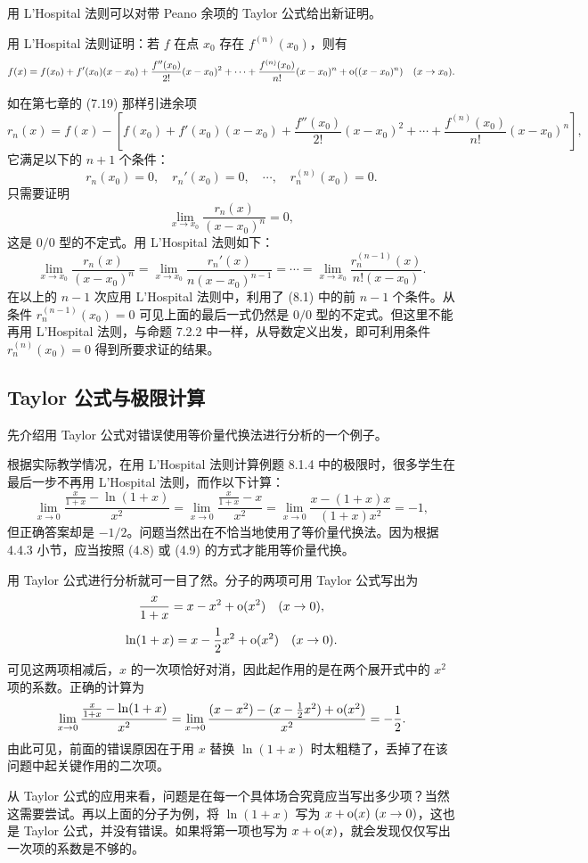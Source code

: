 用 L'Hospital 法则可以对带 Peano 余项的 Taylor 公式给出新证明。

\begin{xexample}[8.1.5]
用 L'Hospital 法则证明：若 $f$ 在点 $x_0$ 存在 $f^{(n)}(x_0)$，则有
\[
  f(x)=f(x_0)+f'(x_0)(x-x_0)+\frac{f''(x_0)}{2!}(x-x_0)^2+\cdots
  +\frac{f^{(n)}(x_0)}{n!}(x-x_0)^n+\mathrm{o}((x-x_0)^n)
  \quad(x\to x_0).
\]
\end{xexample}
\begin{xproof}
如在第七章的 (7.19) 那样引进余项
\[
  r_n(x)=f(x)-\left[f(x_0)+f'(x_0)(x-x_0)+\frac{f''(x_0)}{2!}(x-x_0)^2+\cdots
  +\frac{f^{(n)}(x_0)}{n!}(x-x_0)^n\right],
\]
它满足以下的 $n+1$ 个条件：
\begin{equation}
  r_n(x_0)=0,\quad r_n'(x_0)=0,\quad\cdots,\quad r_n^{(n)}(x_0)=0.
  \tag{8.1}
  \label{eq:8.1}
\end{equation}
只需要证明
\[
  \lim_{x\to x_0}\frac{r_n(x)}{(x-x_0)^n}=0,
\]
这是 $0/0$ 型的不定式。用 L'Hospital 法则如下：
\[
  \lim_{x\to x_0}\frac{r_n(x)}{(x-x_0)^n}
  =\lim_{x\to x_0}\frac{r_n'(x)}{n(x-x_0)^{n-1}}
  =\cdots
  =\lim_{x\to x_0}\frac{r_n^{(n-1)}(x)}{n!(x-x_0)}.
\]
在以上的 $n-1$ 次应用 L'Hospital 法则中，利用了 (8.1) 中的前 $n-1$ 个条件。从条件 $r_n^{(n-1)}(x_0)=0$ 可见上面的最后一式仍然是 $0/0$ 型的不定式。但这里不能再用 L'Hospital 法则，与命题 7.2.2 中一样，从导数定义出发，即可利用条件 $r_n^{(n)}(x_0)=0$ 得到所要求证的结果。
\end{xproof}

\subsection{Taylor 公式与极限计算}

先介绍用 Taylor 公式对错误使用等价量代换法进行分析的一个例子。

\begin{xexample}[8.1.6]
根据实际教学情况，在用 L'Hospital 法则计算例题 8.1.4 中的极限时，很多学生在最后一步不再用 L'Hospital 法则，而作以下计算：
\[
  \lim_{x\to0}\frac{\frac{x}{1+x}-\ln(1+x)}{x^2}
  =\lim_{x\to0}\frac{\frac{x}{1+x}-x}{x^2}
  =\lim_{x\to0}\frac{x-(1+x)x}{(1+x)x^2}=-1,
\]
但正确答案却是 $-1/2$。问题当然出在不恰当地使用了等价量代换法。因为根据 4.4.3 小节，应当按照 (4.8) 或 (4.9) 的方式才能用等价量代换。

用 Taylor 公式进行分析就可一目了然。分子的两项可用 Taylor 公式写出为
\[
  \frac{x}{1+x}=x-x^2+\mathrm{o}(x^2)\quad(x\to0),
\]
\[
  \ln(1+x)=x-\frac12x^2+\mathrm{o}(x^2)\quad(x\to0).
\]
可见这两项相减后，$x$ 的一次项恰好对消，因此起作用的是在两个展开式中的 $x^2$ 项的系数。正确的计算为
\[
  \lim_{x\to0}\frac{\frac{x}{1+x}-\ln(1+x)}{x^2}
  =\lim_{x\to0}\frac{(x-x^2)-(x-\frac12x^2)+\mathrm{o}(x^2)}{x^2}
  =-\frac12.
\]
由此可见，前面的错误原因在于用 $x$ 替换 $\ln(1+x)$ 时太粗糙了，丢掉了在该问题中起关键作用的二次项。

从 Taylor 公式的应用来看，问题是在每一个具体场合究竟应当写出多少项？当然这需要尝试。再以上面的分子为例，将 $\ln(1+x)$ 写为 $x+\mathrm{o}(x)\ (x\to0)$，这也是 Taylor 公式，并没有错误。如果将第一项也写为 $x+\mathrm{o}(x)$，就会发现仅仅写出一次项的系数是不够的。
\end{xexample}

